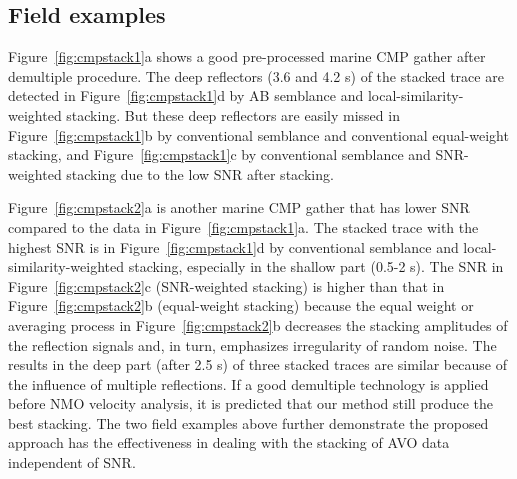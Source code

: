  \subsection{Field examples}
Figure~\ref{fig:cmpstack1}a shows a good pre-processed marine CMP gather after demultiple procedure. The deep reflectors (3.6 and 4.2 s) of the stacked trace are detected in Figure~\ref{fig:cmpstack1}d by AB semblance and local-similarity-weighted stacking. But these deep reflectors are easily missed in Figure~\ref{fig:cmpstack1}b by conventional semblance and conventional equal-weight stacking, and Figure~\ref{fig:cmpstack1}c by conventional semblance and SNR-weighted stacking due to the low SNR after stacking.


Figure~\ref{fig:cmpstack2}a is another marine CMP gather that has lower SNR compared to the data in Figure~\ref{fig:cmpstack1}a. The stacked trace with the highest SNR is in Figure~\ref{fig:cmpstack1}d by conventional semblance and local-similarity-weighted stacking, especially in the shallow part (0.5-2 s). The SNR in Figure~\ref{fig:cmpstack2}c (SNR-weighted stacking) is higher than that in Figure~\ref{fig:cmpstack2}b (equal-weight stacking) because the equal weight or averaging process in Figure~\ref{fig:cmpstack2}b decreases the stacking amplitudes of the reflection signals and, in turn, emphasizes irregularity of random noise. The results in the deep part (after 2.5 s) of three stacked traces are similar because of the influence of multiple reflections. If a good demultiple technology is applied before NMO velocity analysis, it is predicted that our method still produce the best stacking. The two field examples above further demonstrate the proposed approach has the effectiveness in dealing with the stacking of AVO data independent of SNR.


